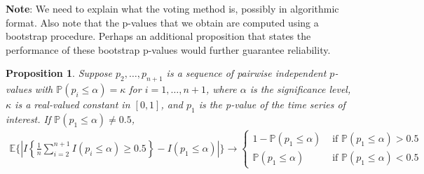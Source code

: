 \documentclass[11pt]{article}
\def\E{\mathbb{E}} %
\def\P{\mathbb{P}}
\newtheorem{prop}{Proposition}
\theoremstyle{definition}
\begin{document}
\noindent\textbf{Note}: We need to explain what the voting method is, possibly in algorithmic format. Also note that the p-values that we obtain are computed using a bootstrap procedure. Perhaps an additional proposition that states the performance of these bootstrap p-values would further guarantee reliability. 

\begin{prop}

\label{votprop}Suppose $p_2, \ldots, p_{n+1}$ is  a sequence of pairwise independent $p$-values  with $\P(p_i \leq \alpha)=\kappa$ for $i = 1, \ldots, n+1$, where $\alpha$ is the significance level, $\kappa$ is a real-valued constant in $[0,1]$, and  $p_1$ is the p-value of the time series of interest. If $\P(p_1 \leq \alpha) \neq 0.5$,
\begin{align*}
  \E \bigg\{\left|I\left\{\frac{1}{n}\sum_{i=2}^{n+1}I(p_i \leq  \alpha) \geq 0.5\right\}
  - I( p_1 \leq  \alpha) \right|\bigg\}
  \to  \begin{cases}
    1- \P(p_1 \leq \alpha) & \text{ if } \P(p_1 \leq \alpha) > 0.5 \\
    \P(p_1 \leq \alpha) & \text{ if } \P(p_1 \leq \alpha) < 0.5 
  \end{cases}
\end{align*}
\end{prop}
\end{document}
